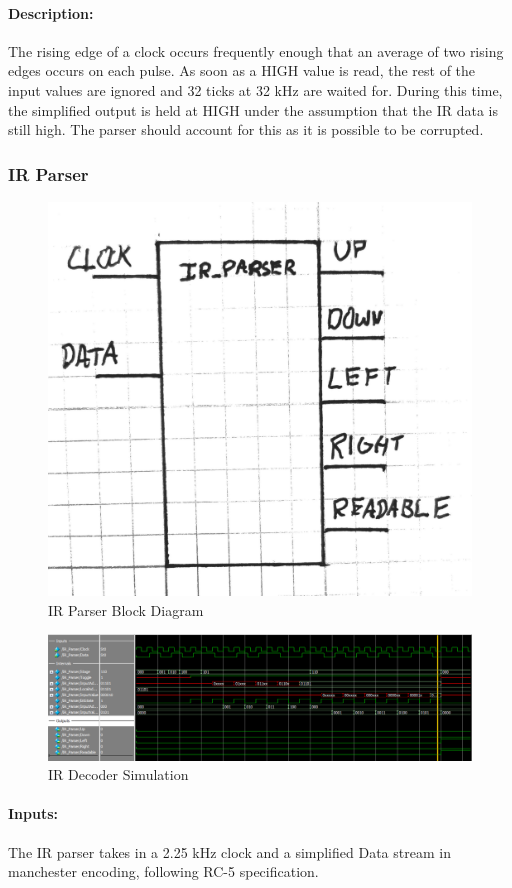 \documentclass[]{article}
\begin{document}
\paragraph{Description:} The rising edge of a clock occurs frequently enough that an average of two rising edges occurs on each pulse. As soon as a HIGH value is read, the rest of the input values are ignored and 32 ticks at 32 kHz are waited for. During this time, the simplified output is held at HIGH under the assumption that the IR data is still high. The parser should account for this as it is possible to be corrupted.


\subsubsection{IR Parser}
\begin{figure}[H]\centering
    \includegraphics[width=0.5\linewidth]{figures/IR_Parser_Block.jpg}
    \caption{IR Parser Block Diagram}
    \label{fig:irParserBlock}
\end{figure}
\begin{figure}[H]\centering
    \includegraphics[width=\linewidth]{figures/IR_Parser_Sim.png}
    \caption{IR Decoder Simulation}
    \label{fig:irParserSim}
\end{figure}
\paragraph{Inputs:} The IR parser takes in a 2.25 kHz clock and a simplified Data stream in manchester encoding, following RC-5 specification.
\end{document}
